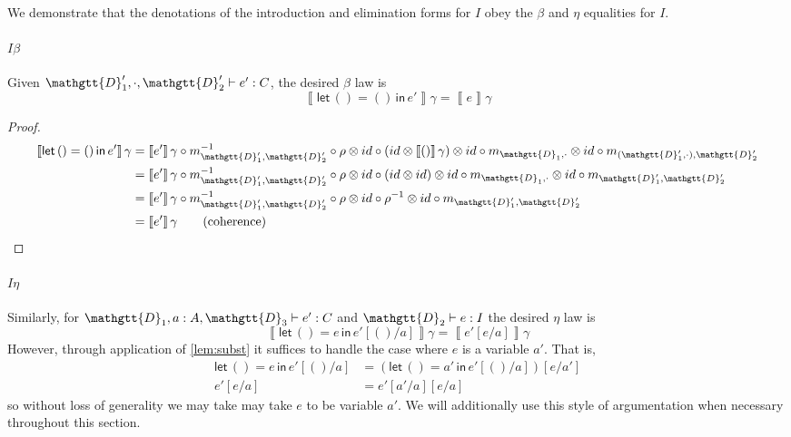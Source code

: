 \documentclass[acmsmall,nonacm]{acmart}
\renewcommand{\Delta}{\mathgtt{D}}
\newcommand{\sem}[1]{\left\llbracket{#1}\right\rrbracket}
\newcommand{\semg}[1]{\sem{#1}\gamma}
\newcommand{\letin}[3]{\mathsf{let}\, #1 = #2 \, \mathsf{in}\, #3}
\begin{document}
\begin{center}
\end{center}

We demonstrate that the denotations of the introduction and elimination forms
for $I$ obey the $\beta$ and $\eta$ equalities for $I$.

\paragraph{$I\beta$}
Given
$\Delta'_{1},\cdot,\Delta'_{2} \vdash e' : C$, the desired
$\beta$ law is
\[
  \semg{\letin {()} {()} {e'}} = \semg{e}
\]
\begin{proof}
\begin{align*}
  \semg{\letin {()} {()} {e'}}
  & = \semg{e'} \circ m^{-1}_{\Delta'_{1},\Delta'_{2}} \circ \rho \otimes id \circ (id \otimes \semg{()}) \otimes id \circ m_{\Delta_{1},\cdot} \otimes id \circ m_{(\Delta'_{1},\cdot),\Delta'_{2}} \\
  & = \semg{e'} \circ m^{-1}_{\Delta'_{1},\Delta'_{2}} \circ \rho \otimes id \circ (id \otimes id) \otimes id \circ m_{\Delta_{1},\cdot} \otimes id \circ m_{\Delta'_{1},\Delta'_{2}} \\
  & = \semg{e'} \circ m^{-1}_{\Delta'_{1},\Delta'_{2}} \circ \rho \otimes id \circ \rho^{-1} \otimes id \circ m_{\Delta'_{1},\Delta'_{2}} \\
  & = \semg{e'} \tag{coherence}
\end{align*}
\end{proof}

\paragraph{$I\eta$}
Similarly, for $\Delta_{1}, a : A, \Delta_{3} \vdash e' : C$ and
$\Delta_{2} \vdash e : I$ the desired $\eta$ law is
\[
\semg{\letin {()} {e} {e'[()/a]}} = \semg{e'[e/a]}
\]
However, through application of \cref{lem:subst} it suffices to handle the case
where $e$ is a variable $a'$. That is,
\begin{align*}
\letin {()} {e} {e'[()/a]} &= (\letin {()} {a'} {e'[()/a]})[e/a'] \\
e'[e/a] &= e'[a'/a][e/a]
\end{align*}
so without loss of generality we may take may take $e$ to be variable $a'$. We
will additionally use this style of argumentation when necessary throughout this section.
\end{document}
